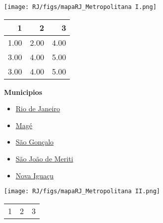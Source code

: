 \documentclass[10pt]{article} %
\begin{document}

\begin{minipage}[t]{.66\linewidth}
\hypertarget{MetI}{}
\texttt{[image: RJ/figs/mapaRJ\_Metropolitana I.png]}\vspace{0.5cm}\begin{center}
\begin{tabular}{rrr}
  \hline
1 & 2 & 3 \\ 
  \hline
1.00 & 2.00 & 4.00 \\ 
  3.00 & 4.00 & 5.00 \\ 
  3.00 & 4.00 & 5.00 \\ 
   \hline
\end{tabular}
\end{center}
\end{minipage}\hfill\begin{minipage}[t]{.30\linewidth}
\begin{mdframed}[style=sidebar,frametitle={}]
\textbf{Municipios}\begin{itemize}\item \hyperlink{Rio}{Rio de Janeiro}
\item \hyperlink{Mag}{Magé}
\item \hyperlink{SGoncalo}{São Gonçalo}
\item \hyperlink{SJMeriti}{São João de Meriti}
\item \hyperlink{Niguacu}{Nova Iguaçu}
\end{itemize}\end{mdframed}\hfill\end{minipage}\newpage\begin{minipage}[t]{.66\linewidth}
\hypertarget{MetII}{}
\texttt{[image: RJ/figs/mapaRJ\_Metropolitana II.png]}\vspace{0.5cm}\begin{center}
\begin{tabular}{rrr}
  \hline
1 & 2 & 3 \\ 

\end{tabular}
\end{center}
\end{minipage}
\end{document}
